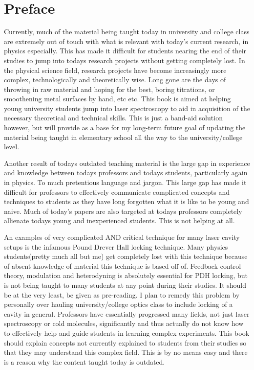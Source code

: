 \documentclass[11pt,a4paper]{book}
\begin{document}
\frontmatter


\tableofcontents

\chapter{Preface}
	\label{chp:preface}Currently, much of the material being taught today in university and college class are extremely out of touch with what is relevant with today's current research, in physics especially. This has made it difficult for students nearing the end of their studies to jump into todays research projects without getting completely lost. In the physical science field, research projects have become increasingly more complex, technologically and theoretically wise. Long gone are the days of throwing in raw material and hoping for the best, boring titrations, or smoothening metal surfaces by hand, etc etc. This book is aimed at helping young university students jump into laser spectroscopy to aid in acquisition of the necessary theoretical and technical skills. This is just a band-aid solution however, but will provide as a base for my long-term future goal of updating the material being taught in elementary school all the way to the university/college level. 
	
	Another result of todays outdated teaching material is the large gap in experience and knowledge between todays professors and todays students, particularly again in physics. To much pretentious language and jargon. This large gap has made it difficult for professors to effectively communicate complicated concepts and techniques to students as they have long forgotten what it is like to be young and naive. Much of today's papers are also targeted at todays professors completely allienate todays young and inexperienced students. This is not helping at all.
	
	An examples of very complicated AND critical technique for many laser cavity setups is the infamous Pound Drever Hall locking technique. Many physics students(pretty much all but me) get completely lost with this technique because of absent knowledge of material this technique is based off of. Feedback control theory, modulation and heterodyning is absolutely essential for PDH locking, but is not being taught to many students at any point during their studies. It should be at the very least, be given as pre-reading. I plan to remedy this problem by personally over hauling university/college optics class to include locking of a cavity in general. Professors have essentially progressed many fields, not just laser spectroscopy or cold molecules, significantly and thus actually do not know how to effectively help and guide students in learning complex experiments. This book should explain concepts not currently explained to students from their studies so that they may understand this complex field. This is by no means easy and there is a reason why the content taught today is outdated.
	
\end{document}

